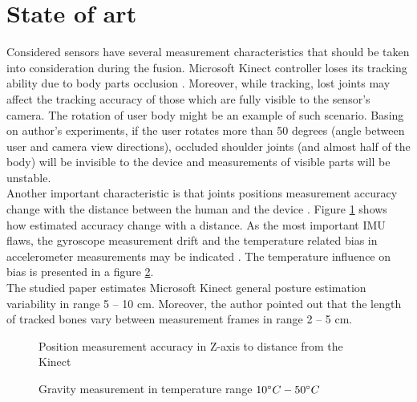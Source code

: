 \documentclass[9pt]{llncs}
\begin{document}
\section{State of art}
Considered sensors have several measurement characteristics that should be taken into consideration during the fusion. Microsoft Kinect controller loses its tracking ability due to body parts occlusion \cite{Asteriadis2013}. Moreover, while tracking, lost joints may affect the tracking accuracy of those which are fully visible to the sensor's camera. The rotation of user body might be an example of such scenario. Basing on author's experiments, if the user rotates more than 50 degrees (angle between user and camera view directions), occluded shoulder joints (and almost half of the body) will be invisible to the device and measurements of visible parts will be unstable.\\
Another important characteristic is that joints positions measurement accuracy change with the distance between the human and the device \cite{Khoshelham2012}. Figure  \ref{fig:kinectDist} shows how estimated accuracy change with a distance. As the most important IMU flaws, the gyroscope measurement drift and the temperature related bias in accelerometer measurements may be indicated \cite{Woodman2007,Nikolic2013}. The temperature influence on bias is presented in a figure \ref{fig:imuTemp}.\\ 
The studied paper \cite{Obdrzalek2012} estimates Microsoft Kinect general posture estimation variability in range 5 -- 10 cm. Moreover, the author pointed out that the length of tracked bones vary between measurement frames in range 2 -- 5 cm.\\

\begin{figure}[H]
	\vspace{2.5cm}
	\caption{Position measurement accuracy in Z-axis to distance from the Kinect}
	\label{fig:kinectDist}
\end{figure}

\begin{figure}[H]
	\vspace{2.5cm}
	\caption{Gravity measurement in temperature range $10\degree C - 50\degree C$}
	\label{fig:imuTemp}
\end{figure}
\end{document}
